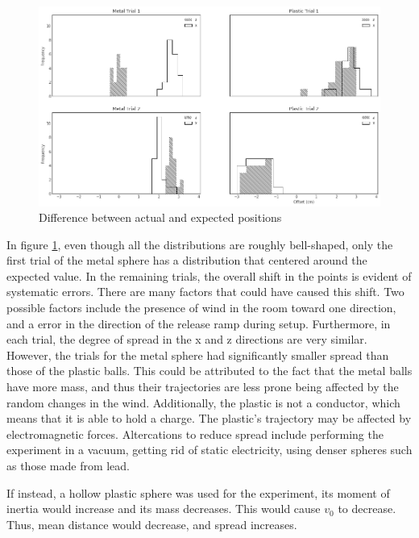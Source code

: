 \documentclass{article}
\begin{document}
\begin{figure}
\begin{center}
\includegraphics[width=1\textwidth]{hist.png} %
    \caption{Difference between actual and expected positions}
    \label{fig:hist}
\end{center}
\end{figure}

In figure \ref{fig:hist}, even though all the distributions are roughly bell-shaped, only the first trial of the metal sphere has a distribution that centered around the expected value. In the remaining trials, the overall shift in the points is evident of systematic errors. There are many factors that could have caused this shift. Two possible factors include the presence of wind in the room toward one direction, and a error in the direction of the release ramp during setup. Furthermore, in each trial, the degree of spread in the x and z directions are very similar. However, the trials for the metal sphere had significantly smaller spread than those of the plastic balls. This could be attributed to the fact that the metal balls have more mass, and thus their trajectories are less prone being affected by the random changes in the wind. Additionally, the plastic is not a conductor, which means that it is able to hold a charge. The plastic's trajectory may be affected by electromagnetic forces. Altercations to reduce spread include performing the experiment in a vacuum, getting rid of static electricity, using denser spheres such as those made from lead. 

If instead, a hollow plastic sphere was used for the experiment, its moment of inertia would increase and its mass decreases. This would cause $v_{0}$ to decrease. Thus, mean distance would decrease, and spread increases.
\end{document}
